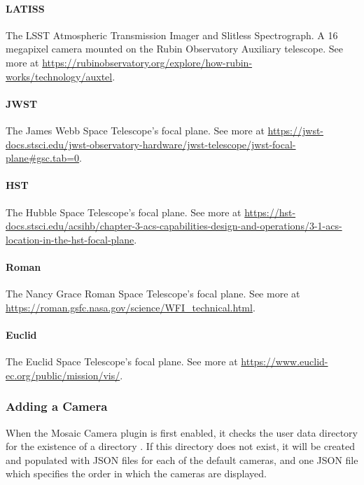 \paragraph{LATISS}

The LSST Atmospheric Transmission Imager and Slitless Spectrograph. A 16 megapixel camera mounted on the Rubin Observatory Auxiliary telescope.
See more at \url{https://rubinobservatory.org/explore/how-rubin-works/technology/auxtel}.

\paragraph{JWST}

The James Webb Space Telescope's focal plane. See more at \url{https://jwst-docs.stsci.edu/jwst-observatory-hardware/jwst-telescope/jwst-focal-plane#gsc.tab=0}.

\paragraph{HST}

The Hubble Space Telescope's focal plane. See more at \url{https://hst-docs.stsci.edu/acsihb/chapter-3-acs-capabilities-design-and-operations/3-1-acs-location-in-the-hst-focal-plane}.

\paragraph{Roman}

The Nancy Grace Roman Space Telescope's focal plane. See more at \url{https://roman.gsfc.nasa.gov/science/WFI_technical.html}.

\paragraph{Euclid}

The Euclid Space Telescope's focal plane. See more at \url{https://www.euclid-ec.org/public/mission/vis/}.

\subsubsection{Adding a Camera}
\label{sec:plugins:MosaicCamera:cameras:add}
When the Mosaic Camera plugin is first enabled, it checks the user data directory for the existence of a directory .
If this directory does not exist, it will be created and populated with JSON files for each of the default cameras, and one JSON file  which specifies the order in which the cameras are displayed.

